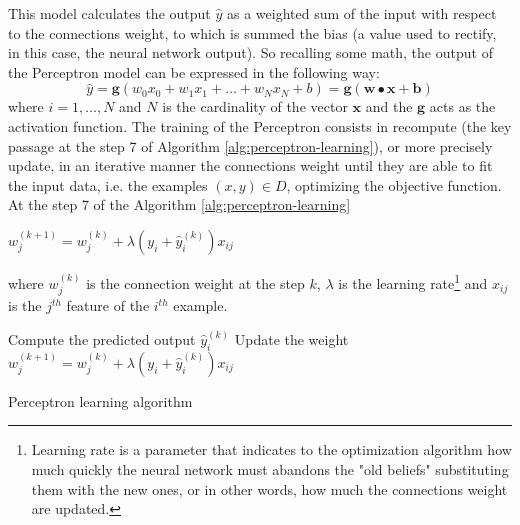This model calculates the output $\hat{y}$ as a weighted sum of the input with respect to the connections weight, to which is summed the bias (a value used to rectify, in this case, the neural network output). So recalling some math, the output of the Perceptron model can be expressed in the following way:
\begin{equation}
	\hat{y} = \textbf{g}(w_{0}x_{0} + w_{1}x_{1} + \dots + w_{N}x_{N} + b  ) = \textbf{g}(\textbf{w} \bullet \textbf{x} + \textbf{b})
\end{equation}
where $i = 1, \dots, N$ and $N$ is the cardinality of the vector $\textbf{x}$ and the $\textbf{g}$ acts as the activation function.
The training of the Perceptron consists in recompute (the key passage at the step 7 of Algorithm \ref{alg:perceptron-learning}), or more precisely update, in an iterative manner the connections weight until they are able to fit the input data, i.e. the examples $(x, y) \in D$, optimizing the objective function.
At the step 7 of the Algorithm \ref{alg:perceptron-learning}
\begin{center}
	$w_{j}^{(k + 1)} = w_{j}^{(k)} + \lambda(y_{i} + \hat{y}_{i}^{(k)})x_{ij}$	
\end{center}
where $w_{j}^{(k)}$ is the connection weight at the step $k$, $\lambda$ is the learning rate\footnote{Learning rate is a parameter that indicates to the optimization algorithm how much quickly the neural network must abandons the "old beliefs" substituting them with the new ones, or in other words, how much the connections weight are updated.} and $x_{ij}$ is the $j^{th}$ feature of the $i^{th}$ example.

\begin{algorithm}
	\begin{algorithmic}[1]
		\Repeat
				\State Compute the predicted output $\hat{y}_{i}^{(k)}$
					\State Update the weight $w_{j}^{(k + 1)} = w_{j}^{(k)} + \lambda(y_{i} + \hat{y}_{i}^{(k)})x_{ij}$
				\EndFor
			\EndFor
	\end{algorithmic}
	\caption{Perceptron learning algorithm \cite{ITDM:2014}}\label{alg:perceptron-learning}
\end{algorithm}

